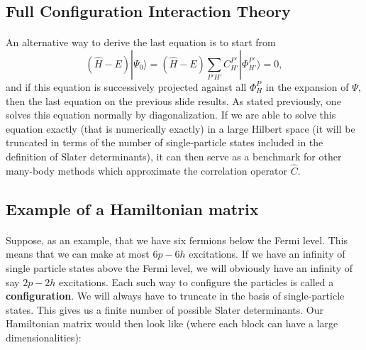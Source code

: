 \subsection*{Full Configuration Interaction Theory}

\paragraph{}
An alternative way to derive the last equation is to start from 
\[
(\hat{H} -E)|\Psi_0\rangle = (\hat{H} -E)\sum_{P'H'}C_{H'}^{P'}|\Phi_{H'}^{P'} \rangle=0, 
\]
and if this equation is successively projected against all $\Phi_H^P$ in the expansion of $\Psi$, then the last equation on the previous slide
results.   As stated previously, one solves this equation normally by diagonalization. If we are able to solve this equation exactly (that is
numerically exactly) in a large Hilbert space (it will be truncated in terms of the number of single-particle states included in the definition
of Slater determinants), it can then serve as a benchmark for other many-body methods which approximate the correlation operator
$\hat{C}$.



\subsection*{Example of a Hamiltonian matrix}

\paragraph{}
Suppose, as an example, that we have six fermions below the Fermi level.
This means that we can make at most $6p-6h$ excitations. If we have an infinity of single particle states above the Fermi level, we will obviously have an infinity of say $2p-2h$ excitations. Each such way to configure the particles is called a \textbf{configuration}. We will always have to truncate in the basis of single-particle states.
This gives us a finite number of possible Slater determinants. Our Hamiltonian matrix would then look like (where each block can have a large dimensionalities):


